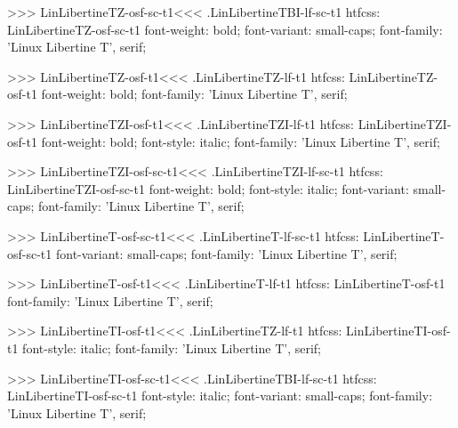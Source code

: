 {{{{{{{>>>
\<LinLibertineTZ-osf-sc-t1\><<<
.LinLibertineTBI-lf-sc-t1
htfcss:  LinLibertineTZ-osf-sc-t1  font-weight: bold; font-variant: small-caps; font-family: 'Linux Libertine T', serif;

>>>
\<LinLibertineTZ-osf-t1\><<<
.LinLibertineTZ-lf-t1
htfcss:  LinLibertineTZ-osf-t1  font-weight: bold; font-family: 'Linux Libertine T', serif;

>>>
\<LinLibertineTZI-osf-t1\><<<
.LinLibertineTZI-lf-t1
htfcss:  LinLibertineTZI-osf-t1  font-weight: bold; font-style: italic; font-family: 'Linux Libertine T', serif;

>>>
\<LinLibertineTZI-osf-sc-t1\><<<
.LinLibertineTZI-lf-sc-t1
htfcss:  LinLibertineTZI-osf-sc-t1  font-weight: bold; font-style: italic; font-variant: small-caps; font-family: 'Linux Libertine T', serif;

>>>
\<LinLibertineT-osf-sc-t1\><<<
.LinLibertineT-lf-sc-t1
htfcss:  LinLibertineT-osf-sc-t1  font-variant: small-caps; font-family: 'Linux Libertine T', serif;

>>>
\<LinLibertineT-osf-t1\><<<
.LinLibertineT-lf-t1
htfcss:  LinLibertineT-osf-t1  font-family: 'Linux Libertine T', serif;

>>>
\<LinLibertineTI-osf-t1\><<<
.LinLibertineTZ-lf-t1
htfcss:  LinLibertineTI-osf-t1  font-style: italic; font-family: 'Linux Libertine T', serif;

>>>
\<LinLibertineTI-osf-sc-t1\><<<
.LinLibertineTBI-lf-sc-t1
htfcss:  LinLibertineTI-osf-sc-t1  font-style: italic; font-variant: small-caps; font-family: 'Linux Libertine T', serif;

}}}}}}}

